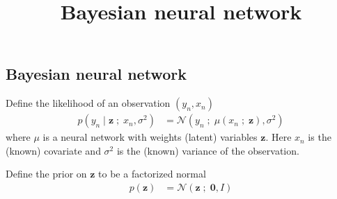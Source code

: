 \title{Bayesian neural network}

\subsection{Bayesian neural network}

Define the likelihood of an observation $(y_n, x_n)$
\begin{align*}
  p(y_n \mid \mathbf{z} \;;\; x_n, \sigma^2)
  &=
  \mathcal{N}(y_n \;;\; \mu(x_n\;;\;\mathbf{z}), \sigma^2)
\end{align*}
where $\mu$ is a neural network with weights (latent) variables
$\mathbf{z}$. Here $x_n$ is the (known) covariate and $\sigma^2$ is the
(known) variance of the observation.

Define the prior on $\mathbf{z}$ to be a factorized normal
\begin{align*}
  p(\mathbf{z})
  &=
  \mathcal{N}(\mathbf{z} \;;\; \mathbf{0}, I)
\end{align*}

